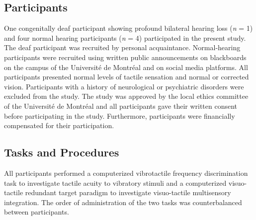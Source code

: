 \documentclass[12pt]{article}
\begin{document}
\subsection{Participants}
One congenitally deaf participant showing profound bilateral hearing loss (\textit{n} = 1) and four normal hearing participants (\textit{n} = 4) participated in the present study. The deaf participant was recruited by personal acquaintance. Normal-hearing participants were recruited using written public announcements on blackboards on the campus of the Université de Montréal and on social media platforms. All participants presented normal levels of tactile sensation and normal or corrected vision. Participants with a history of neurological or psychiatric disorders were excluded from the study. The study was approved by the local ethics committee of the Université de Montréal and all participants gave their written consent before participating in the study. Furthermore, participants were financially compensated for their participation.
\subsection{Tasks and Procedures}
All participants performed a computerized vibrotactile frequency discrimination task to investigate tactile acuity to vibratory stimuli and a computerized visuo-tactile redundant target paradigm to investigate visuo-tactile multisensory integration. The order of administration of the two tasks was counterbalanced between participants.
\end{document}
